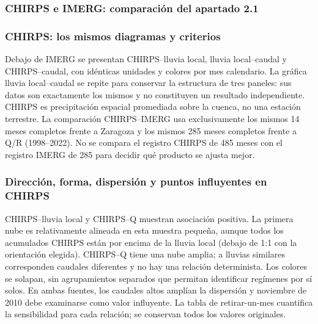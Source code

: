 \documentclass[10pt,a4paper]{article}
\begin{document}
\subsubsection*{CHIRPS e IMERG: comparación del apartado 2.1}
\subsubsection*{CHIRPS: los mismos diagramas y criterios}
Debajo de IMERG se presentan CHIRPS--lluvia local, lluvia local--caudal y CHIRPS--caudal, con idénticas unidades y colores por mes calendario. La gráfica lluvia local--caudal se repite para conservar la estructura de tres paneles: sus datos son exactamente los mismos y no constituyen un resultado independiente. CHIRPS es precipitación espacial promediada sobre la cuenca, no una estación terrestre. La comparación CHIRPS--IMERG usa exclusivamente los mismos 14 meses completos frente a Zaragoza y los mismos 285 meses completos frente a Q/R (1998--2022). No se compara el registro CHIRPS de 485 meses con el registro IMERG de 285 para decidir qué producto se ajusta mejor.
\subsubsection*{Dirección, forma, dispersión y puntos influyentes en CHIRPS}
CHIRPS--lluvia local y CHIRPS--Q muestran asociación positiva. La primera nube es relativamente alineada en esta muestra pequeña, aunque todos los acumulados CHIRPS están por encima de la lluvia local (debajo de 1:1 con la orientación elegida). CHIRPS--Q tiene una nube amplia; a lluvias similares corresponden caudales diferentes y no hay una relación determinista. Los colores se solapan, sin agrupamientos separados que permitan identificar regímenes por sí solos. En ambas fuentes, los caudales altos amplían la dispersión y noviembre de 2010 debe examinarse como valor influyente. La tabla de retirar-un-mes cuantifica la sensibilidad para cada relación; se conservan todos los valores originales.
\end{document}
